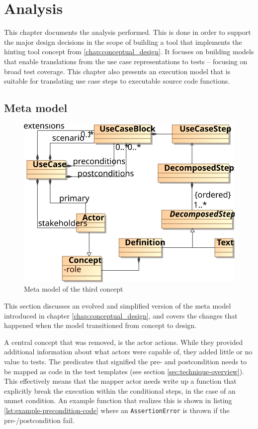 \chapter{Analysis}
\label{ch:design}
This chapter documents the analysis performed. This is done in order to support the major design decisions in the scope of building a tool that implements the hinting tool concept from \ref{chap:conceptual_design}. It focuses on building models that enable translations from the use case representations to tests -- focusing on broad test coverage. This chapter also presents an execution model that is suitable for translating use case steps to executable source code functions.

\section{Meta model}
\begin{figure}[!htbp]
  \centering
  \includegraphics[scale=0.9]{img/3rd_iteration_meta_model}
  \caption{Meta model of the third concept}
  \label{fig:3rd_iteration_meta_model}
\end{figure}
\noindent This section discusses an evolved and simplified version of the meta model introduced in chapter \ref{chap:conceptual_design}, and covers the changes that happened when the model transitioned from concept to design.\medskip

\noindent A central concept that was removed, is the actor actions. While they provided additional information about what actors were capable of, they added little or no value to tests. The predicates that signified the pre- and postcondition needs to be mapped as code in the test templates (see section \ref{sec:technique-overview}). This effectively means that the mapper actor needs write up a function that explicitly break the execution within the conditional steps, in the case of an unmet condition. An example function that realizes this is shown in listing \ref{lst:example-precondition-code} where an \texttt{AssertionError} is thrown if the pre-/postcondition fail.\medskip

